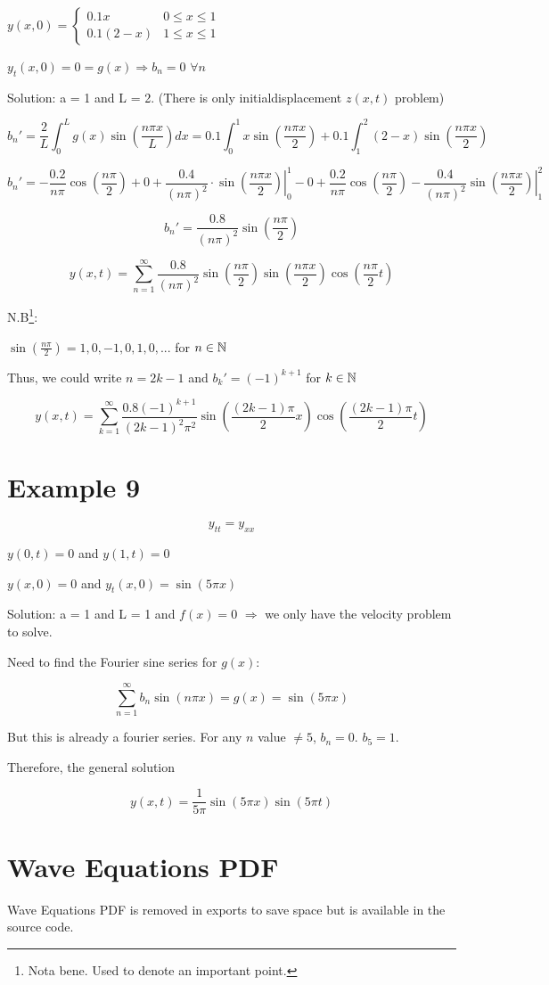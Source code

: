 \documentclass{article}
\begin{document}
$y(x,0) = \left\{ \begin{matrix} 0.1 x & 0 \leq x \leq 1 \\ 0.1(2-x) & 1 \leq x \leq 1 \end{matrix} \right.$

$y_t (x,0) = 0 = g(x) \Rightarrow b_n = 0$ $ \forall n$

Solution: a = 1 and L = 2. (There is only initialdisplacement $z(x,t)$ problem)

$$b_n' = \frac{2}{L} \int_0^L g(x) \sin \left( \frac{ n \pi x}{L} \right) dx = 0.1 \int_0^1 x \sin \left( \frac{ n \pi x}{2} \right) + 0.1\int_1^2 (2-x) \sin \left( \frac{ n \pi x}{2} \right) $$

$$b_n' = - \frac{0.2}{n \pi} \cos \left( \frac{n \pi}{2} \right) + 0 + \frac{0.4}{(n \pi)^2 } \cdot \left. \sin \left( \frac{n \pi x}{2} \right) \right|_0^1  - 0 + \frac{0.2}{n \pi} \cos( \frac{n \pi}{2}) - \frac{0.4}{(n \pi)^2} \left. \sin  \left( \frac{n \pi x}{2} \right) \right|_1^2$$

$$b_n' = \frac{0.8}{(n \pi)^2 } \sin \left( \frac{n \pi}{2} \right)$$


$$y(x,t) = \sum_{n = 1}^\infty \frac{0.8}{(n \pi)^2 } \sin \left( \frac{n \pi}{2} \right) \sin \left( \frac{n \pi x}{2} \right) \cos \left( \frac{n \pi}{2} t \right)$$

N.B\footnote{Nota bene. Used to denote an important point. }:

$\sin (\frac{n \pi}{2}) = 1,0,-1,0,1,0,...$ for $n \in \mathbb{N}$

Thus, we could write $n = 2k-1$ and $b_k' = (-1)^{k+1}$ for $k \in \mathbb{N}$

$$y(x,t) = \sum_{k  =1}^\infty \frac{0.8 (-1)^{k + 1}}{(2k-1)^2 \pi^2} \sin \left( \frac{(2k-1) \pi}{2} x \right) \cos \left( \frac{(2k-1) \pi}{2} t \right)$$

\section{Example 9}

$$y_{tt} = y_{xx}$$

$y(0,t) = 0$ and $y(1,t) = 0$

$y(x,0) = 0$ and $y_t(x,0) = \sin(5 \pi x)$

Solution: a = 1 and L = 1 and $f(x) = 0$ $\Rightarrow$ we only have the velocity problem to solve. 

Need to find the Fourier sine series for $g(x)$:

$$\sum_{n  =1}^\infty b_n \sin(n \pi x) = g(x) = \sin(5 \pi x)$$

But this is already a fourier series. For any $n$ value $\neq 5$, $b_n = 0$. $b_5 = 1$. 

Therefore, the general solution 

$$y(x,t) = \frac{1}{5 \pi} \sin (5 \pi x) \sin(5 \pi t)$$

\section{Wave Equations PDF}

Wave Equations PDF is removed in exports to save space but is available in the source code. 

%
\end{document}
